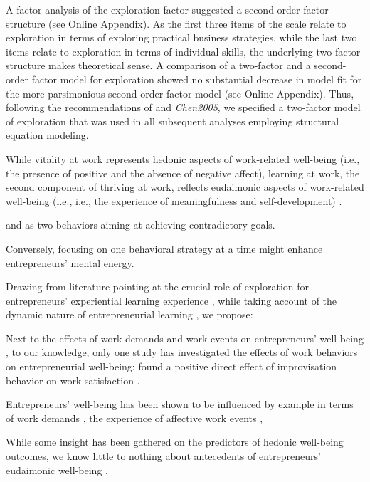 \documentclass[man, 12pt, a4paper, noextraspace]{apa6}
\begin{document}
A factor analysis of the exploration factor suggested a second-order factor structure (see Online Appendix).
As the first three items of the scale relate to exploration in terms of exploring practical business strategies, while the last two items relate to exploration in terms of individual skills, the underlying two-factor structure makes theoretical sense.
A comparison of a two-factor and a second-order factor model for exploration showed no substantial decrease in model fit for the more parsimonious second-order factor model (see Online Appendix). 
Thus, following the recommendations of \textcite{Gerbing1984} and \textit{Chen2005}, we specified a two-factor model of exploration that was used in all subsequent analyses employing structural equation modeling.

While vitality at work represents hedonic aspects of work-related well-being (i.e., the presence of positive and the absence of negative aﬀect), learning at work, the second component of thriving at work, reflects eudaimonic aspects of work-related well-being (i.e., i.e., the experience of meaningfulness and self-development) \parencite[e.g.,][]{Ryan2001, Spreitzer.2005b}. 

and as two behaviors aiming at achieving contradictory goals. 

Conversely, focusing on one behavioral strategy at a time might enhance entrepreneurs' mental energy. 

Drawing from literature pointing at the crucial role of exploration for entrepreneurs' experiential learning experience \parencite[e.g.,][]{Minniti.2001, Holcomb2009}, while taking account of the dynamic nature of entrepreneurial learning \parencite{Cope.2000}, we propose:

Next to the effects of work demands and work events on entrepreneurs' well-being \parencite[e.g.,][]{Uy.2017, Perry.2008, Lechat2017}, to our knowledge, only one study has investigated the effects of work behaviors on entrepreneurial well-being: \textcite{Uy.2017} found a positive direct effect of improvisation behavior on work satisfaction \parencite{Uy.2017}. 

Entrepreneurs' well-being has been shown to be influenced by example in terms of work demands \parencite{Perry.2008}, the experience of affective work events \parencite{Uy.2017}, 

While some insight has been gathered on the predictors of hedonic well-being outcomes, we know little to nothing about antecedents of entrepreneurs' eudaimonic well-being \parencite{Stephan2018}. \par
\end{document}
